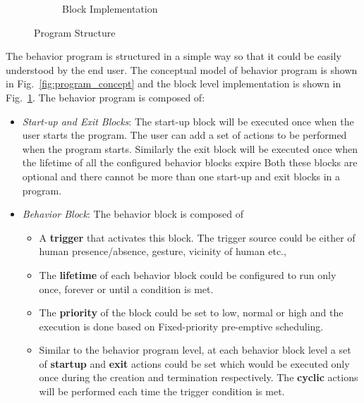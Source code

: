 \documentclass{llncs}
\begin{document}
\begin{figure}
\begin{subfigure}[t]{0.48\textwidth}
\caption[Block Implementation]{Block Implementation}
\label{fig:program_blocks}
\end{subfigure}
\caption[Program Structure]{Program Structure}
\label{fig:program}
\end{figure}
The behavior program is structured in a simple way so that it could be easily understood by the end user. The conceptual model of behavior program is shown in Fig.~\ref{fig:program_concept} and the block level implementation is shown in Fig.~\ref{fig:program_blocks}. The behavior program is composed of:
\begin{itemize}
\item \emph{Start-up and Exit Blocks}: The start-up block will be executed once when the user starts the program. The user can add a set of actions to be performed when the program starts. Similarly the exit block will be executed once when the lifetime of all the configured behavior blocks expire Both these blocks are optional and there cannot be more than one start-up and exit blocks in a program.
\item \emph{Behavior Block}: The behavior block is composed of
\begin{itemize}
\item A \textbf{trigger} that activates this block. The trigger source could be either of human presence/absence, gesture, vicinity of human etc.,
\item The \textbf{lifetime} of each behavior block could be configured to run only once, forever or until a condition is met. 
\item The \textbf{priority} of the block could be set to low, normal or high and the execution is done based on Fixed-priority pre-emptive scheduling.
\item Similar to the behavior program level, at each behavior block level a set of \textbf{startup} and \textbf{exit} actions could be set which would be executed only once during the creation and termination respectively. The \textbf{cyclic} actions will be performed each time the trigger condition is met.
\end{itemize}
\end{itemize}
\end{document}
